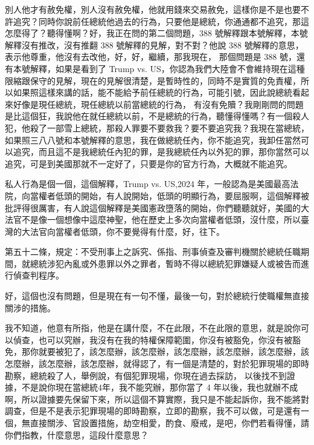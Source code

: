 \hypertarget{c11:cue:156}{}別人他才有赦免權，別人沒有赦免權，他就用錢來交易赦免，這樣你是不是也要不許追究？同時你說前任總統他過去的行為，只要他是總統，你通通都不追究，那這怎麼得了？聽得懂啊？好，我正在問的第二個問題，388 號解釋跟本號解釋，本號解釋沒有推改，沒有推翻 388 號解釋的見解，對不對？他說 388 號解釋的意思，表示他尊重，他沒有去改他，好，好，繼續，那我現在，
\hypertarget{c11:cue:157}{}那個問題是 388 號，還有本號解釋，如果是看到了 Trump vs. US，你認為我們大陸會不會維持現在這種限縮跟保守的見解，現在的見解很清楚，是暫時性的，同時不是實質的免責權，所以如果照這樣來講的話，能不能給予前任總統的行為，可能引號，因此說總統看起來好像是現任總統，現任總統以前當總統的行為，
\hypertarget{c11:cue:158}{}有沒有免贖？我剛剛問的問題是比這個狂，我說他在就任總統以前，不是總統的行為，聽懂得懂嗎？有一個殺人犯，他殺了一部雪上總統，那殺人罪要不要救我？要不要追究我？我現在當總統，如果照三八八號和本號解釋的意思，我在做總統任內，你不能追究，我卸任當然可以追究，而且這不是我總統任內犯的罪，是我總統任內以外犯的罪，那你當然可以追究，可是到美國那就不一定好了，只要是你的官方行為，大概就不能追究。

\hypertarget{c11:cue:159}{}私人行為是個一個，這個解釋，Trump vs. US,2024 年，一般認為是美國最高法院，向當權者低頭的開始，有人說開始，低頭的明顯行為，要屈服啊，這個解釋被批評得很厲害，有人說這個解釋是美國憲政墮落的開始，你們聽聽就好，美國的大法官不是像一個想像中這麼神聖，他在歷史上多次向當權者低頭，沒什麼，所以臺灣的大法官向當權者低頭，你不要覺得有什麼，好，往下。

\hypertarget{c11:cue:160}{}第五十二條，規定：不受刑事上之訴究、係指、刑事偵查及審判機關於總統任職期間，就總統涉犯內亂或外患罪以外之罪者，暫時不得以總統犯罪嫌疑人或被告而進行偵查判程序。\par{}好，這個也沒有問題，但是現在有一句不懂，最後一句，對於總統行使職權無直接關涉的措施。

\hypertarget{c11:cue:161}{}我不知道，他意有所指，他是在講什麼，不在此限，不在此限的意思，就是說你可以偵查，也可以究辦，我沒有在我的特權保障範圍，你沒有被豁免，你沒有被豁免，那你就要被犯了，該怎麼辦，該怎麼辦，該怎麼辦，該怎麼辦，該怎麼辦，該怎麼辦，該怎麼辦，該怎麼辦，就得認了，有一個是清楚的，對於犯罪現場的即時勘察，總統殺了人，舉例說，有個犯罪現場，你現在過去採訪，
\hypertarget{c11:cue:162}{}以後找不到證據，不是說你現在當總統4年，我不能究辦，那你當了 4 年以後，我也就辦不成啊，所以證據要先保留下來，所以這個不算實際，我只是不能起訴你，我不能將對調查，但是不是表示犯罪現場的即時勘察，立即的勘察，我不可以做，可是還有一個，無直接關涉、官設置措施，劫空相愛，酌食、廢戒，是吧，你們若看得懂，請你們指教，什麼意思，這段什麼意思？

